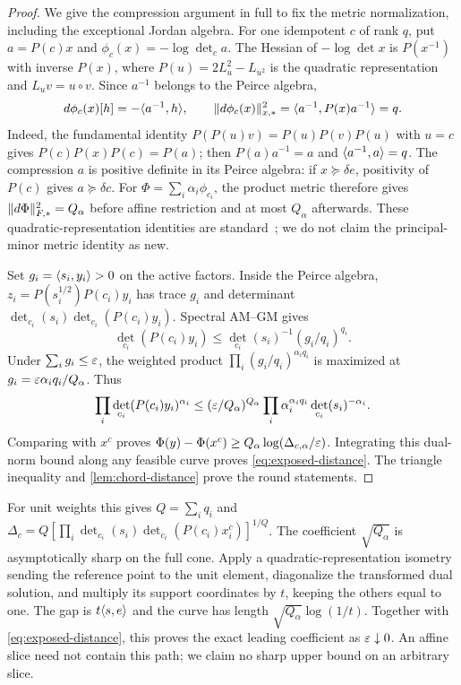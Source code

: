 \begin{proof}
We give the compression argument in full to fix the metric
normalization, including the exceptional Jordan algebra. For one idempotent $c$ of
rank $q$, put $a=P(c)x$ and $\phi_c(x)=-\log\det_c a$.
The Hessian of $-\log\det x$ is $P(x^{-1})$ with inverse $P(x)$,
where $P(u)=2L_u^2-L_{u^2}$ is the quadratic representation and
$L_uv=u\circ v$. Since $a^{-1}$ belongs to the Peirce algebra,
\[
 d\phi_c(x)[h]=-\langle a^{-1},h\rangle,\qquad
 \lVert d\phi_c(x)\rVert_{x,*}^2=\langle a^{-1},P(x)a^{-1}\rangle=q.
\]
Indeed, the fundamental identity $P(P(u)v)=P(u)P(v)P(u)$ with $u=c$
gives $P(c)P(x)P(c)=P(a)$; then $P(a)a^{-1}=a$ and
$\langle a^{-1},a\rangle=q$. The compression $a$ is positive definite in its
Peirce algebra: if $x\succeq\delta e$, positivity of $P(c)$ gives
$a\succeq\delta c$.
For $\Phi=\sum_i\alpha_i\phi_{c_i}$, the product metric therefore gives
$\lVert d\Phi\rVert_{F,*}^2=Q_\alpha$ before affine restriction and at most
$Q_\alpha$ afterwards. These quadratic-representation identities are
standard~\cite{FarautKoranyi1994}; we do not claim the principal-minor
metric identity as new.

Set $g_i=\langle s_i,y_i\rangle>0$ on the active factors. Inside the Peirce
algebra, $z_i=P(s_i^{1/2})P(c_i)y_i$ has trace $g_i$ and determinant
$\det_{c_i}(s_i)\det_{c_i}(P(c_i)y_i)$.
Spectral AM--GM gives
\[
 \det_{c_i}(P(c_i)y_i)
 \leq\det_{c_i}(s_i)^{-1}(g_i/q_i)^{q_i}.
\]
Under $\sum_i g_i\leq\varepsilon$, the weighted product
$\prod_i(g_i/q_i)^{\alpha_iq_i}$ is maximized at
$g_i=\varepsilon\alpha_iq_i/Q_\alpha$. Thus
\[
 \prod_i\det_{c_i}(P(c_i)y_i)^{\alpha_i}
 \leq(\varepsilon/Q_\alpha)^{Q_\alpha}
 \prod_i\alpha_i^{\alpha_iq_i}\det_{c_i}(s_i)^{-\alpha_i}.
\]
Comparing with $x^c$ proves
$\Phi(y)-\Phi(x^c)\geq Q_\alpha\log(\Delta_{c,\alpha}/\varepsilon)$.
Integrating this dual-norm bound along any feasible curve proves \eqref{eq:exposed-distance}. The triangle inequality and \cref{lem:chord-distance} prove the round
statements.
\end{proof}
For unit weights this gives $Q=\sum_iq_i$ and
$\Delta_c=Q[\prod_i\det_{c_i}(s_i)\det_{c_i}(P(c_i)x_i^c)]^{1/Q}$.
The coefficient $\sqrt{Q_\alpha}$ is asymptotically sharp on the full
cone. Apply a quadratic-representation
isometry sending the reference point to the unit element, diagonalize
the transformed dual solution, and multiply its support coordinates by
$t$, keeping the others equal to one. The gap is
$t\langle s,e\rangle$ and the curve has length
$\sqrt{Q_\alpha}\log(1/t)$. Together with
\eqref{eq:exposed-distance}, this proves the exact leading coefficient
as $\varepsilon\downarrow0$. An affine slice need not contain this path; we
claim no sharp upper bound on an arbitrary slice.

